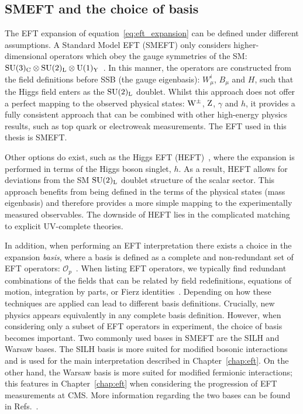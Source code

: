 \subsection{SMEFT and the choice of basis}
The EFT expansion of equation~\ref{eq:eft_expansion} can be defined under different assumptions. A Standard Model EFT (SMEFT) only considers higher-dimensional operators which obey the gauge symmetries of the SM: ${\rm{SU}}(3)_{\rm{C}} \otimes {\rm{SU}}(2)_{\rm{L}} \otimes {\rm{U}}(1)_{\rm{Y}}$~\cite{Brivio:2017vri}. In this manner, the operators are constructed from the field definitions before SSB (the gauge eigenbasis): $W^i_\mu$, $B_\mu$ and $H$, such that the Higgs field enters as the ${\rm{SU}(2)_{\rm{L}}}$ doublet. Whilst this approach does not offer a perfect mapping to the observed physical states: ${\rm{W}}^{\pm}$, ${\rm{Z}}$, $\gamma$ and $h$, it provides a fully consistent approach that can be combined with other high-energy physics results, such as top quark or electroweak measurements. The EFT used in this thesis is SMEFT. 

Other options do exist, such as the Higgs EFT (HEFT)~\cite{Brivio:2017vri,deFlorian:2016spz}, where the expansion is performed in terms of the Higgs boson singlet, $h$. As a result, HEFT allows for deviations from the SM ${\rm{SU}(2)_{\rm{L}}}$ doublet structure of the scalar sector. This approach benefits from being defined in the terms of the physical states (mass eigenbasis) and therefore provides a more simple mapping to the experimentally measured observables. The downside of HEFT lies in the complicated matching to explicit UV-complete theories.

In addition, when performing an EFT interpretation there exists a choice in the expansion \textit{basis}, where a basis is defined as a complete and non-redundant set of EFT operators: $\mathcal{O}_p$~\cite{deFlorian:2016spz}. When listing EFT operators, we typically find redundant combinations of the fields that can be related by field redefinitions, equations of motion, integration by parts, or Fierz identities~\cite{Ellis:2018gqa}. Depending on how these techniques are applied can lead to different basis definitions. Crucially, new physics appears equivalently in any complete basis definition. However, when considering only a subset of EFT operators in experiment, the choice of basis becomes important. Two commonly used bases in SMEFT are the SILH and Warsaw bases. The SILH basis is more suited for modified bosonic interactions and is used for the main interpretation described in Chapter~\ref{chap:eft}. On the other hand, the Warsaw basis is more suited for modified fermionic interactions; this features in Chapter~\ref{chap:eft} when considering the progression of EFT measurements at CMS. More information regarding the two bases can be found in Refs.~\cite{Giudice:2007fh,Contino:2013kra,Grzadkowski:2010es}.

